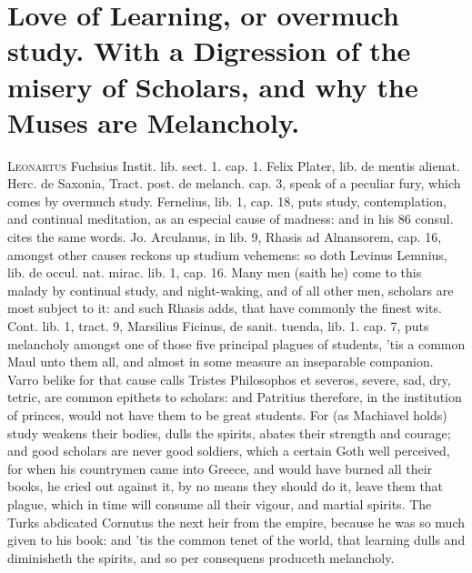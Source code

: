 {%
\clearpage{}
\thispagestyle{titleontop}

\section[Love of Learning, or overmuch study.]{Love of Learning, or overmuch study. With a Digression of the misery of Scholars, and why the Muses are Melancholy.}
\lettrine{L}{eonartus} Fuchsius Instit. lib.  sect. 1. cap. 1. Felix Plater,
lib.  de mentis alienat. Herc. de Saxonia, Tract. post. de melanch.
cap. 3, speak of a peculiar fury, which comes by overmuch study.
Fernelius, lib. 1, cap. 18, puts study, contemplation, and
continual meditation, as an especial cause of madness: and in his 86
consul. cites the same words. Jo. Arculanus, in lib. 9, Rhasis ad
Alnansorem, cap. 16, amongst other causes reckons up studium vehemens:
so doth Levinus Lemnius, lib. de occul. nat. mirac. lib. 1, cap. 16.
Many men (saith he) come to this malady by continual study,
and night-waking, and of all other men, scholars are most subject to
it: and such Rhasis adds, that have commonly the finest wits.
Cont. lib. 1, tract. 9, Marsilius Ficinus, de sanit. tuenda, lib. 1.
cap. 7, puts melancholy amongst one of those five principal plagues of
students, 'tis a common Maul unto them all, and almost in some measure
an inseparable companion. Varro belike for that cause calls Tristes
Philosophos et severos, severe, sad, dry, tetric, are common epithets
to scholars: and Patritius therefore, in the institution of
princes, would not have them to be great students. For (as Machiavel
holds) study weakens their bodies, dulls the spirits, abates their
strength and courage; and good scholars are never good soldiers, which
a certain Goth well perceived, for when his countrymen came into
Greece, and would have burned all their books, he cried out against it,
by no means they should do it,  leave them that plague, which in
time will consume all their vigour, and martial spirits. The
Turks abdicated Cornutus the next heir from the empire, because
he was so much given to his book: and 'tis the common tenet of the
world, that learning dulls and diminisheth the spirits, and so per
consequens produceth melancholy.

}

